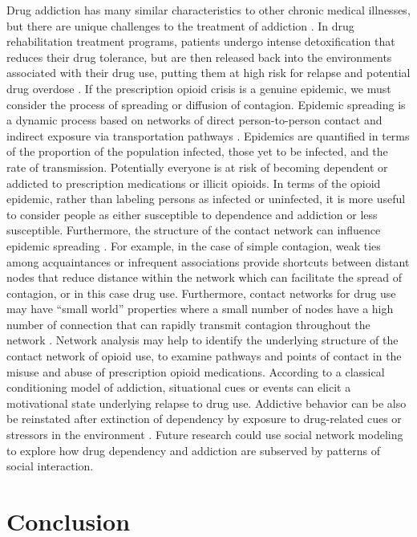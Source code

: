 \documentclass[sigconf]{acmart}
\begin{document}
Drug addiction has many similar characteristics to other chronic medical 
illnesses, but there are unique challenges to the treatment of addiction
\cite{marsch12, swendson16}. In drug rehabilitation treatment programs, 
patients undergo intense detoxification that reduces their drug tolerance, 
but are then released back into the environments associated with their drug 
use, putting them at high risk for relapse and potential drug overdose 
\cite{johnson11}. If the prescription opioid crisis is a genuine epidemic, 
we must consider the process of spreading or diffusion of contagion. Epidemic 
spreading is a dynamic process based on networks of direct person-to-person 
contact and indirect exposure via transportation pathways \cite{Colizza06}. 
Epidemics are quantified in terms of the proportion of the population infected, 
those yet to be infected, and the rate of transmission. Potentially everyone
is at risk of becoming dependent or addicted to prescription medications or 
illicit opioids. In terms of the opioid epidemic, rather than labeling persons 
as infected or uninfected, it is more useful to consider people as either 
susceptible to dependence and addiction or less susceptible. Furthermore, 
the structure of the contact network can influence epidemic spreading
\cite{pastor01}. For example, in the case of simple contagion, weak 
ties among acquaintances or infrequent associations provide shortcuts between 
distant nodes that reduce distance within the network \cite{granovetter73} 
which can facilitate the spread of contagion, or in this case drug use. 
Furthermore, contact networks for drug use may have ``small world'' properties
where a small number of nodes have a high number of connection that can 
rapidly transmit contagion throughout the network \cite{watts98}. Network 
analysis may help to identify the underlying structure of the contact network
of opioid use, to examine pathways and points of contact in the misuse and 
abuse of prescription opioid medications. According to a classical conditioning
model of addiction, situational cues or events can elicit a motivational state 
underlying relapse to drug use. Addictive behavior can be also be reinstated 
after extinction of dependency by exposure to drug-related cues or stressors 
in the environment \cite{shaham03}. Future research could use social network 
modeling to explore how drug dependency and addiction are subserved by patterns 
of social interaction. 

\section{Conclusion}
\end{document}

